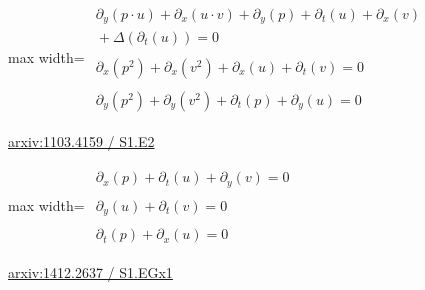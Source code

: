 \documentclass[10pt,a4paper]{article}
\begin{document}
\begin{minipage}{\linewidth}
\begin{center}\begin{adjustbox}{max width=\linewidth}$\displaystyle\begin{gathered}\begin{gathered}\partial_{y}(p\cdot u)+\partial_{x}(u\cdot v)+\partial_{y}(p)+\partial_{t}(u)+\partial_{x}(v)\\[-1pt]{}+\Delta(\partial_{t}(u))=0\end{gathered}\\[5pt]\begin{gathered}\partial_{x}(p^{2})+\partial_{x}(v^{2})+\partial_{x}(u)+\partial_{t}(v)=0\end{gathered}\\[5pt]\begin{gathered}\partial_{y}(p^{2})+\partial_{y}(v^{2})+\partial_{t}(p)+\partial_{y}(u)=0\end{gathered}\end{gathered}$\end{adjustbox}\end{center}
{\small \href{https://arxiv.org/html/1103.4159#S1.E2}{arxiv:1103.4159 / S1.E2}}\par
\end{minipage}\par\vspace{7mm}

\begin{minipage}{\linewidth}
\begin{center}\begin{adjustbox}{max width=\linewidth}$\displaystyle\begin{gathered}\begin{gathered}\partial_{x}(p)+\partial_{t}(u)+\partial_{y}(v)=0\end{gathered}\\[5pt]\begin{gathered}\partial_{y}(u)+\partial_{t}(v)=0\end{gathered}\\[5pt]\begin{gathered}\partial_{t}(p)+\partial_{x}(u)=0\end{gathered}\end{gathered}$\end{adjustbox}\end{center}
{\small \href{https://arxiv.org/html/1412.2637#S1.EGx1}{arxiv:1412.2637 / S1.EGx1}}\par
\end{minipage}\par\vspace{7mm}
\end{document}
